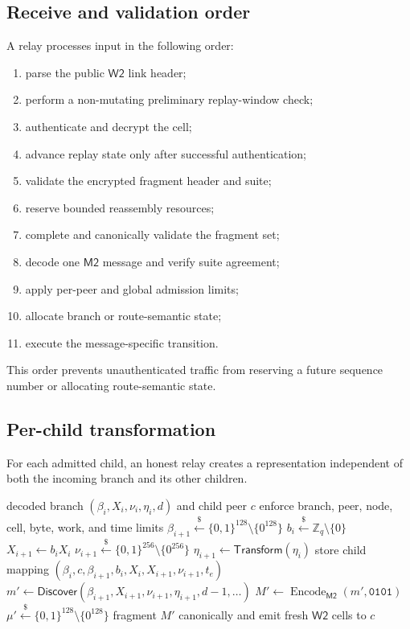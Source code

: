 \documentclass[11pt,oneside]{article}
\newcommand{\sample}{\xleftarrow{\$}}
\newcommand{\Zq}{\mathbb{Z}_q}
\newcommand{\Encode}{\operatorname{Encode}}
\newcommand{\Rone}{\ensuremath{\mathsf{R1}}}
\newcommand{\Mtwo}{\ensuremath{\mathsf{M2}}}
\newcommand{\Wtwo}{\ensuremath{\mathsf{W2}}}
\newcommand{\code}[1]{\texttt{#1}}
\begin{document}
\subsection{Receive and validation order}

A relay processes input in the following order:

\begin{enumerate}
  \item parse the public \Wtwo{} link header;
  \item perform a non-mutating preliminary replay-window check;
  \item authenticate and decrypt the cell;
  \item advance replay state only after successful authentication;
  \item validate the encrypted fragment header and suite;
  \item reserve bounded reassembly resources;
  \item complete and canonically validate the fragment set;
  \item decode one \Mtwo{} message and verify suite agreement;
  \item apply per-peer and global admission limits;
  \item allocate branch or route-semantic state;
  \item execute the message-specific transition.
\end{enumerate}

This order prevents unauthenticated traffic from reserving a future sequence number or allocating route-semantic state.

\subsection{Per-child transformation}

For each admitted child, an honest relay creates a representation independent of both the incoming branch and its other children.

\begin{algorithm}[ht]
\caption{Relay forwards one admitted \Rone{} child branch}
\label{alg:forwardchild}
\begin{algorithmic}[1]
\Require decoded branch $(\beta_i,X_i,\nu_i,\eta_i,d)$ and child peer $c$
\State enforce branch, peer, node, cell, byte, work, and time limits
\State $\beta_{i+1}\sample\{0,1\}^{128}\setminus\{0^{128}\}$
\State $b_i\sample\Zq\setminus\{0\}$
\State $X_{i+1}\gets b_iX_i$
\State $\nu_{i+1}\sample\{0,1\}^{256}\setminus\{0^{256}\}$ 
\State $\eta_{i+1}\gets\mathsf{Transform}(\eta_i)$ 
\State store child mapping $(\beta_i,c,\beta_{i+1},b_i,X_i,X_{i+1},\nu_{i+1},t_e)$
\State $m'\gets\mathsf{Discover}(\beta_{i+1},X_{i+1},\nu_{i+1},\eta_{i+1},d-1,\ldots)$
\State $M'\gets\Encode_{\Mtwo}(m',\code{0101})$
\State $\mu'\sample\{0,1\}^{128}\setminus\{0^{128}\}$
\State fragment $M'$ canonically and emit fresh \Wtwo{} cells to $c$
\end{algorithmic}
\end{algorithm}
\end{document}

